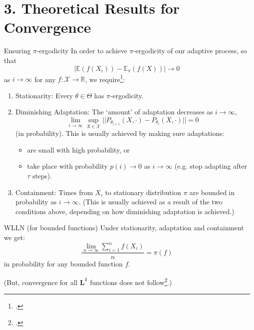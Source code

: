 \documentclass[aspectratio=169]{beamer}
\begin{document}
\section{3. Theoretical Results for Convergence}
\begin{frame}{Ensuring $\pi$-ergodicity}
    In order to achieve $\pi$-ergodicity of our adaptive process, so that
    $$|\mathbb{E}(f(X_i)) - \mathbb{E}_\pi (f(X)) | \to 0$$
    as $i \to \infty$ for any $f: \mathcal{X} \to \mathbb{R}$, we require\footcite{roberts_coupling_2005}:


    \begin{enumerate}[<+->]
        \item \alert{Stationarity}: Every $\theta \in \Theta$ has $\pi$-ergodicity.
        \item \alert{Diminishing Adaptation}: The `amount' of adaptation decreases as $i \to \infty$,
        $$\lim_{i \to \infty} \sup_{X \in \mathcal{X}} ||P_{\theta_{i+1}}(X, \cdot) - P_{\theta_i}(X, \cdot)|| = 0$$
        (in probability). 
        This is usually achieved by making sure adaptations:

        \begin{itemize}[<+->]
            \item are small with high probability, or
            \item take place with probability $p(i) \to 0$ as $i \to \infty$ (e.g. stop adapting after $\tau$ steps).%
        \end{itemize}
        \item \alert{Containment}: Times from $X_i$ to stationary distribution $\pi$ are bounded in probability as $i \to \infty$.
        (This is usually achieved as a result of the two conditions above, depending on how diminishing adaptation is achieved.)
    \end{enumerate} 
\end{frame}

\begin{frame}{WLLN (for bounded functions)}
    Under stationarity, adaptation and containment we get:
    $$\frac{\lim_{n \to \infty} \sum_{i=1}^n f(X_i)}{n} = \pi(f)$$
    in probability for any bounded function $f$.

    \pause 
    \vspace{1em}

    (But, convergence for all $\mathbf{L^1}$ functions does not follow\footcite{yang_ergodicity_2008}.)
\end{frame}
\end{document}
